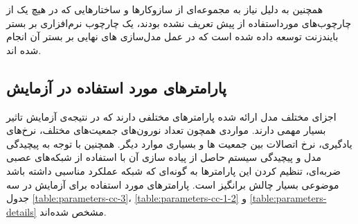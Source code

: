\documentclass[12pt]{report}
\begin{document}
	همچنین به دلیل نیاز به مجموعه‌ای از سازوکار‌ها و ساختارهایی که در هیچ یک از چارچوب‌های مورد‌استفاده از پیش تعریف نشده بودند، یک چارچوب نرم‌افزاری بر بستر بایندزنت توسعه داده شده است که در عمل مدل‌سازی های نهایی بر بستر آن انجام شده اند.
	
	\subsection{پارامتر‌های مورد استفاده در آزمایش}
	اجزای مختلف مدل ارائه شده پارامتر‌های مختلفی دارند که در نتیجه‌ی آزمایش تاثیر بسیار مهمی دارند. مواردی همچون تعداد نورون‌های جمعیت‌های مختلف، نرخ‌های یادگیری، نرخ اتصالات بین جمعیت ها و بسیاری موارد دیگر. همچنین با توجه به پیچیدگی مدل و پیچیدگی سیستم حاصل از پیاده سازی آن با استفاده از شبکه‌های عصبی ضربه‌ای، تنظیم کردن این پارامتر‌ها به گونه‌ای که شبکه عملکرد مناسبی داشته باشد موضوعی بسیار چالش برانگیز است. پارامتر‌های مورد استفاده برای آزمایش در سه جدول \ref{table:parameters-cc-3}، \ref{table:parameters-cc-1-2} و \ref{table:parameters-details} مشخص شده‌اند.
\end{document}
